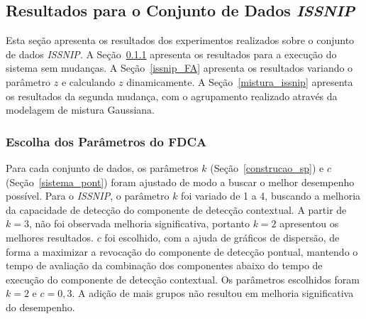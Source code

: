 \documentclass[cic,tc]{iiufrgs}
\begin{document}
\subsection{Resultados para o Conjunto de Dados \textit{ISSNIP}}
\label{res_issnip}
Esta seção apresenta os resultados dos experimentos realizados sobre o conjunto de dados \textit{ISSNIP}. A Seção~\ref{issnip_fdca} apresenta os resultados para a execução do sistema sem mudanças. A Seção~\ref{issnip_FA} apresenta os resultados variando o parâmetro $z$ e calculando $z$ dinamicamente. A Seção~\ref{mistura_issnip} apresenta os resultados da segunda mudança, com o agrupamento realizado através da modelagem de mistura Gaussiana.

\subsubsection{Escolha dos Parâmetros do FDCA}
\label{issnip_fdca}
Para cada conjunto de dados, os parâmetros $k$ (Seção~\ref{construcao_sp}) e $c$ (Seção~\ref{sistema_pont}) foram ajustado de modo a buscar o melhor desempenho possível. Para o \textit{ISSNIP}, o parâmetro $k$ foi variado de 1 a 4, buscando a melhoria da capacidade de detecção do componente de detecção contextual. A partir de $k= 3$, não foi observada melhoria significativa, portanto $k = 2$ apresentou os melhores resultados. $c$ foi escolhido, com a ajuda de gráficos de dispersão, de forma a maximizar a revocação do componente de detecção pontual, mantendo o tempo de avaliação da combinação dos componentes abaixo do tempo de execução do componente de detecção contextual. Os parâmetros escolhidos foram $k = 2$ e $c = 0,3$. A adição de mais grupos não resultou em melhoria significativa do desempenho.

\bigskip
\begin{table}[h]
\begin{adjustwidth}{-.5in}{-.5in}
    \caption{Avaliação do FDCA para o conjunto de dados \textit{ISSNIP}}
    \bigskip
    \begin{center}
    \label{av_issnip}
    \end{center}
\end{adjustwidth}
\end{table}
\end{document}
